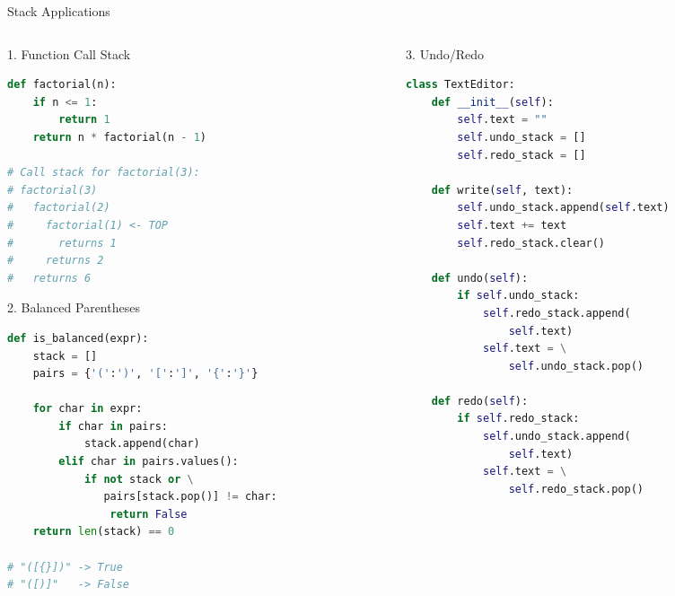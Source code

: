\documentclass[aspectratio=169,xcolor=dvipsnames]{beamer}
\begin{document}
\begin{frame}[fragile]{Stack Applications}
  \begin{columns}
    \begin{column}{0.48\textwidth}
      \begin{exampleblock}{1. Function Call Stack}
        \begin{lstlisting}[language=Python,basicstyle=\tiny\ttfamily]
def factorial(n):
    if n <= 1:
        return 1
    return n * factorial(n - 1)

# Call stack for factorial(3):
# factorial(3)
#   factorial(2)
#     factorial(1) <- TOP
#       returns 1
#     returns 2
#   returns 6
        \end{lstlisting}
      \end{exampleblock}

      \begin{exampleblock}{2. Balanced Parentheses}
        \begin{lstlisting}[language=Python,basicstyle=\tiny\ttfamily]
def is_balanced(expr):
    stack = []
    pairs = {'(':')', '[':']', '{':'}'}

    for char in expr:
        if char in pairs:
            stack.append(char)
        elif char in pairs.values():
            if not stack or \
               pairs[stack.pop()] != char:
                return False
    return len(stack) == 0

# "([{}])" -> True
# "([)]"   -> False
        \end{lstlisting}
      \end{exampleblock}
    \end{column}
    \begin{column}{0.48\textwidth}
      \begin{exampleblock}{3. Undo/Redo}
        \begin{lstlisting}[language=Python,basicstyle=\tiny\ttfamily]
class TextEditor:
    def __init__(self):
        self.text = ""
        self.undo_stack = []
        self.redo_stack = []

    def write(self, text):
        self.undo_stack.append(self.text)
        self.text += text
        self.redo_stack.clear()

    def undo(self):
        if self.undo_stack:
            self.redo_stack.append(
                self.text)
            self.text = \
                self.undo_stack.pop()

    def redo(self):
        if self.redo_stack:
            self.undo_stack.append(
                self.text)
            self.text = \
                self.redo_stack.pop()
        \end{lstlisting}
      \end{exampleblock}


\end{column}
\end{columns}
\end{frame}
\end{document}
